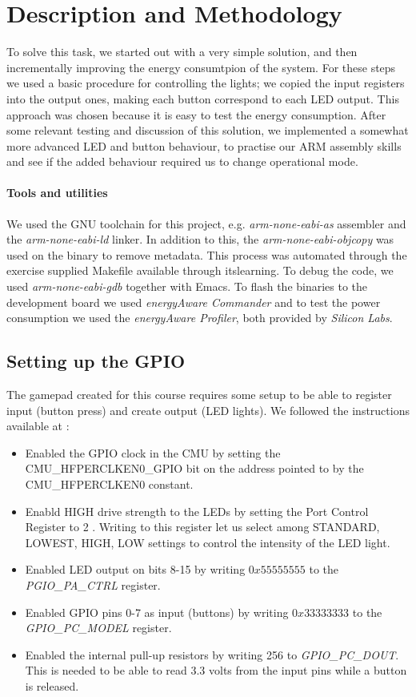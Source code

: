 \section{Description and Methodology}
\label{section:description_and_methodology}
To solve this task, we started out with a very simple solution, and then incrementally improving the energy consumtpion of the system. For these steps we used a basic procedure for controlling the lights; we copied the input registers into the output ones, making each button correspond to each LED output. This approach was chosen because it is easy to test the energy consumption. After some relevant testing and discussion of this solution, we implemented a somewhat more advanced LED and button behaviour, to practise our ARM assembly skills and see if the added behaviour required us to change operational mode. 

	\paragraph{Tools and utilities}
	We used the GNU toolchain for this project, e.g. \emph{arm-none-eabi-as} assembler and the \emph{arm-none-eabi-ld} linker. In addition to this, the \emph{arm-none-eabi-objcopy} was used on the binary to remove metadata. This process was automated through the exercise supplied Makefile available through itslearning. To debug the code, we used \emph{arm-none-eabi-gdb} together with Emacs. To flash the binaries to the development board we used \emph{energyAware Commander} and to test the power consumption we used the \emph{energyAware Profiler}, both provided by \emph{Silicon Labs}.
	\subsection{Setting up the GPIO}
	\label{subsection:gpio_setup}
	The gamepad created for this course requires some setup to be able to register input (button press) and create output (LED lights). We followed the instructions available at \cite[p. 24]{compendium}:
	
	\begin{itemize}
		\item Enabled the GPIO clock in the CMU by setting the CMU\_HFPERCLKEN0\_GPIO bit on the address pointed to by the CMU\_HFPERCLKEN0 constant.
		\item Enabld HIGH drive strength to the LEDs by setting the Port Control Register to 2 \cite[p. 766]{reference_manual}. Writing to this register let us select among STANDARD, LOWEST, HIGH, LOW settings to control the intensity of the LED light.
		\item Enabled LED output on bits 8-15 by writing $0x55555555$ to the \emph{PGIO\_PA\_CTRL} register.
		\item Enabled GPIO pins 0-7 as input (buttons) by writing $0x33333333$ to the \emph{GPIO\_PC\_MODEL} register.
		\item Enabled the internal pull-up resistors by writing 256 to \emph{GPIO\_PC\_DOUT}. This is needed to be able to read 3.3 volts from the input pins while a button is released. 
	\end{itemize}

